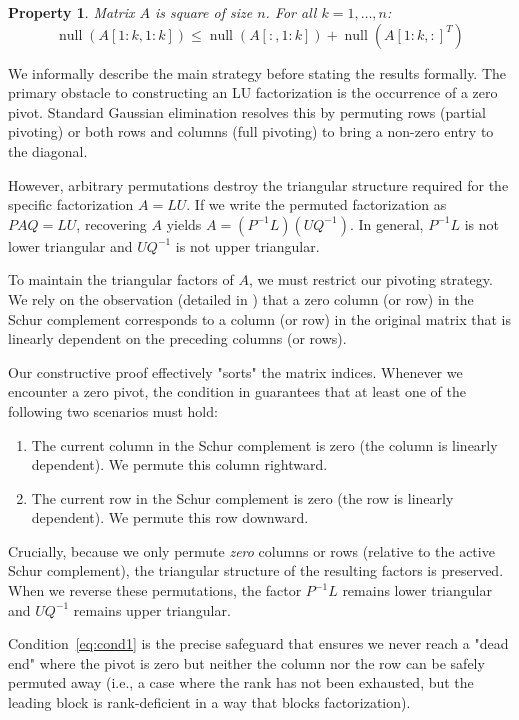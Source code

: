 \documentclass{article}
\DeclareMathOperator{\nl}{null}
\newtheorem{property}{Property}[section]
\begin{document}
\begin{property}\label{prop:rank}
    Matrix $A$ is square of size $n$. For all $k = 1, \ldots, n$:
    \begin{equation}
        \label{eq:cond1}
        \nl(A[1:k,1:k]) \le \nl(A[:,1:k]) + \nl({A[1:k,:]}^T)
    \end{equation}
\end{property}

We informally describe the main strategy before stating the results formally. The primary obstacle to constructing an LU factorization is the occurrence of a zero pivot. Standard Gaussian elimination resolves this by permuting rows (partial pivoting) or both rows and columns (full pivoting) to bring a non-zero entry to the diagonal.

However, arbitrary permutations destroy the triangular structure required for the specific factorization $A=LU$. If we write the permuted factorization as $P A Q = L U$, recovering $A$ yields $A = (P^{-1} L) (U Q^{-1})$. In general, $P^{-1} L$ is not lower triangular and $U Q^{-1}$ is not upper triangular.

To maintain the triangular factors of $A$, we must restrict our pivoting strategy. We rely on the observation (detailed in ) that a zero column (or row) in the Schur complement corresponds to a column (or row) in the original matrix that is linearly dependent on the preceding columns (or rows).

Our constructive proof effectively "sorts" the matrix indices. Whenever we encounter a zero pivot, the condition in  guarantees that at least one of the following two scenarios must hold:
\begin{enumerate}
    \item The current column in the Schur complement is zero (the column is linearly dependent). We permute this column rightward.
    \item The current row in the Schur complement is zero (the row is linearly dependent). We permute this row downward.
\end{enumerate}

Crucially, because we only permute \emph{zero} columns or rows (relative to the active Schur complement), the triangular structure of the resulting factors is preserved. When we reverse these permutations, the factor $P^{-1} L$ remains lower triangular and $U Q^{-1}$ remains upper triangular.

Condition~\eqref{eq:cond1} is the precise safeguard that ensures we never reach a "dead end" where the pivot is zero but neither the column nor the row can be safely permuted away (i.e., a case where the rank has not been exhausted, but the leading block is rank-deficient in a way that blocks factorization).
\end{document}
